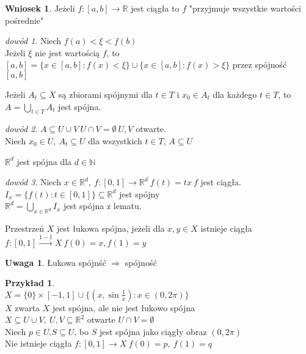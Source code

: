 \documentclass[twoside,10pt]{article}
\theoremstyle{definition}
\theoremstyle{definition}
\theoremstyle{definition}
\theoremstyle{definition}
\theoremstyle{remark}
\newtheorem*{dd}{dowód}
\theoremstyle{definition}
\newtheorem*{uw}{Uwaga}
\theoremstyle{definition}
\newtheorem*{wn}{Wniosek}
\theoremstyle{definition}
\theoremstyle{definition}
\newtheorem*{prz}{Przykład}
\theoremstyle{definition}
\theoremstyle{definition}
\begin{document}
\begin{wn} 
    Jeżeli $f: [a,b] \to \mathbb{R}$ jest ciągła to $f$ "przyjmuje wszystkie wartości 
    pośrednie"
\end{wn} 
\begin{dd} 
    Niech $f(a) < \xi < f(b)$ \\ 
    Jeżeli $\xi$ nie jest wartością $f$, to $[a,b] = \{x \in [a,b]: f(x) < \xi \} \cup 
    \{ x \in [a,b]: f(x) > \xi \}$ przez spójność $[a,b]$
\end{dd} 
\begin{lem} 
    Jeżeli $A_t \subseteq X$ są zbiorami spójnymi dla $t \in T$ i $x_0 \in A_t$ dla 
    każdego $t \in T$, to $A = \bigcup\limits_{t \in T} A_t$ jest spójna. 
    \begin{dd} 
        $A \subseteq U \cup V \ U \cap V = \emptyset \ U,V$ otwarte. \\ 
        Niech $x_0 \in U,\ A_t \subseteq U$ dla wszystkich $t \in T$, $A \subseteq U$
    \end{dd} 
\end{lem} 
\begin{tw} 
    $\mathbb{R}^d$ jest spójna dla $d \in \mathbb{N}$
\end{tw} 
\begin{dd} 
    Niech $x \in \mathbb{R}^d,\ f:[0,1] \to \mathbb R^d \ f(t) = tx \ f$ jest ciągła. 
    $I_x = \{f(t): t \in [0,1]\} \subseteq \mathbb R^d$ jest spójny \\ 
    $\mathbb{R}^d = \bigcup\limits_{x \in \mathbb R^d} I_x$ jest spójna z lematu. 
\end{dd} 
\begin{df} 
    Przestrzeń $X$ jest łukowa spójna, jeżeli dla $x,y \in X$ istnieje ciągła 
    $f: [0,1] \xrightarrow{1-1} X \ f(0) = x, f(1) = y$
\end{df} 
\begin{uw} 
    Łukowa spójnść $\Rightarrow$ spójność
\end{uw} 
\begin{prz} ~\\ 
    $X = \{0\} \times [-1,1] \cup \{ (x,\sin \frac{1}{x}): x \in (0,2\pi) \} $ \\ 
    $X$ zwarta
    $X$ jest spójna, ale nie jest łukowo spójna \\ 
    $X \subseteq U \cup V, \ U, V \subseteq \mathbb{R}^2$ otwarte $U \cap V = \emptyset$\\
    Niech $p \in U. S \subseteq U$, bo $S$ jest spójna jako ciągły obraz $(0,2\pi)$ \\ 
    Nie istnieje ciągła $f:[0,1] \to X \ f(0) = p,\ f(1) = q$
\end{prz} 
\end{document}
